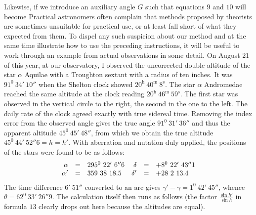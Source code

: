 Likewise, if we introduce an auxiliary angle $G$ such that
equations $9$ and $10$ will become
Practical astronomers often complain that methods proposed by theorists are sometimes unsuitable for practical use, or at least fall short of what they expected from them. To dispel any such suspicion about our method and at the same time illustrate how to use the preceding instructions, it will be useful to work through an example from actual observations in some detail. On August $21$ of this year, at our observatory, I observed the uncorrected double altitude of the star $\alpha$ Aquilae with a Troughton sextant with a radius of ten inches. It was $91^0\ 34'\ 10''$ when the Shelton clock showed $20^{\mathrm h}\ 40^{\mathrm m}\ 8^{\mathrm s}$. The star $\alpha$ Andromedae reached the same altitude at the clock reading $20^{\mathrm h}\ 46^{\mathrm m}\ 59^{\mathrm s}$. The first star was observed in the vertical circle to the right, the second in the one to the left. The daily rate of the clock agreed exactly with true sidereal time. Removing the index error from the observed angle gives the true angle $91^0\ 31'\ 36''$ and thus the apparent altitude $45^0\ 45'\ 48''$, from which we obtain the true altitude $45^0\ 44'\ 52''6=h=h'$. With aberration and nutation duly applied, the positions of the stars were found to be as follows:
\[
\begin{array}{rcl@{\quad}rcl}
\alpha&=&295^0\ 22'\ 6''6&\delta&=&+8^0\ 22'\ 43''1\\
\alpha'&=&359\ 38\ 18.5&\delta'&=&+28\ 2\ 13.4
\end{array}
\]
The time difference $6'\ 51''$ converted to an arc gives $\gamma'-\gamma=1^0\ 42'\ 45''$, whence $\theta=62^0\ 33'\ 26''9$. The calculation itself then runs as follows (the factor $\frac{\sin h'}{\sin h}$ in formula $13$ clearly drops out here because the altitudes are equal).
